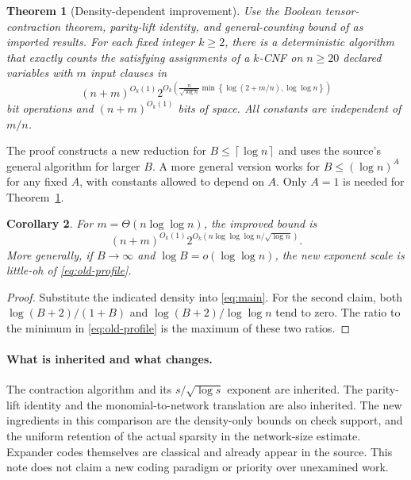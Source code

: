 \documentclass[11pt]{article}
\numberwithin{equation}{section}
\newtheorem{theorem}{Theorem}[section]
\newtheorem{corollary}[theorem]{Corollary}
\theoremstyle{definition}\newtheorem{definition}[theorem]{Definition}
\theoremstyle{remark}\newtheorem{remark}[theorem]{Remark}
\newcommand{\ceil}[1]{\left\lceil#1\right\rceil}
\begin{document}
\begin{theorem}[Density-dependent improvement]\label{thm:main}
Use the Boolean tensor-contraction theorem, parity-lift identity, and
general-counting bound of \cite{OAI2026} as imported results.
For each fixed integer $k\ge2$, there is a
deterministic algorithm that exactly counts the satisfying assignments
of a $k$-CNF on $n\ge20$ declared variables with $m$ input clauses in
\begin{equation}\label{eq:main}
 (n+m)^{O_k(1)}
 2^{O_k\!\left(\frac{n}{\sqrt{\log n}}
       \min\left\{\log(2+m/n),\log\log n\right\}\right)}
\end{equation}
bit operations and $(n+m)^{O_k(1)}$ bits of space.
All constants are independent of $m/n$.
\end{theorem}

The proof constructs a new reduction for
$B\le\ceil{\log n}$ and uses the source's general algorithm for larger
$B$. A more general version works for $B\le(\log n)^A$ for any fixed
$A$, with constants allowed to depend on $A$. Only $A=1$ is needed
for Theorem~\ref{thm:main}.

\begin{corollary}\label{cor:intermediate}
For $m=\Theta(n\log\log n)$, the improved bound is
\[
 (n+m)^{O_k(1)}
 2^{O_k(n\log\log\log n/\sqrt{\log n})}.
\]
More generally, if $B\to\infty$ and
$\log B=o(\log\log n)$, the new exponent scale is little-oh of
\eqref{eq:old-profile}.
\end{corollary}
\begin{proof}
Substitute the indicated density into \eqref{eq:main}. For the second
claim, both $\log(B+2)/(1+B)$ and
$\log(B+2)/\log\log n$ tend to zero. The ratio to the minimum
in \eqref{eq:old-profile} is the maximum of these two ratios.
\end{proof}

\paragraph{What is inherited and what changes.}
The contraction algorithm and its $s/\sqrt{\log s}$ exponent are
inherited. The parity-lift identity and the monomial-to-network
translation are also inherited. The new ingredients in this comparison
are the density-only bounds on check support, and the uniform retention
of the actual sparsity in the network-size estimate. Expander codes
themselves are classical and already appear in the source. This note
does not claim a new coding paradigm or priority over unexamined work.
\end{document}
